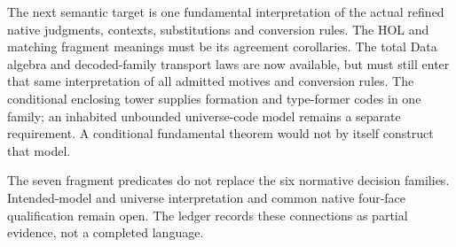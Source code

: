 \documentclass[11pt]{article}
\theoremstyle{definition}
\theoremstyle{remark}
\begin{document}
The next semantic target is one fundamental interpretation of the actual
refined native judgments, contexts, substitutions and conversion rules.
The HOL and matching fragment meanings must be its agreement corollaries.
The total Data algebra and decoded-family transport laws are now available,
but must still enter that same interpretation of all admitted motives and
conversion rules. The conditional enclosing tower supplies formation and
type-former codes in one family; an inhabited unbounded universe-code model
remains a separate requirement. A conditional fundamental theorem would not
by itself construct that model.

The seven fragment predicates do not replace the six normative decision
families. Intended-model and universe interpretation and common native
four-face qualification remain open. The ledger
records these connections as partial evidence, not a completed language.
\end{document}
